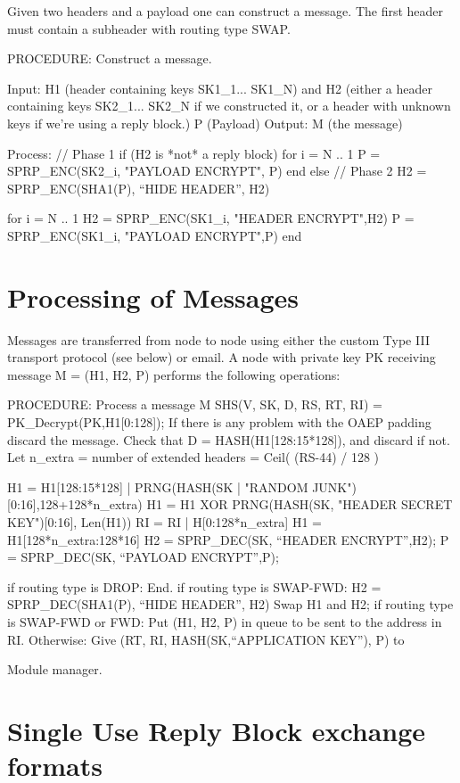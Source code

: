 Given two headers and a payload one can construct a
message. The first header must contain a subheader
with routing type SWAP.  

PROCEDURE: Construct a message.

Input: H1 (header containing keys SK1_1... SK1_N)
       and H2 (either a header containing keys SK2_1... SK2_N if
         we constructed it, or a header with unknown keys if we're
         using a reply block.)
       P (Payload)
Output: M (the message)

Process:
	// Phase 1
	if (H2 is *not* a reply block)
		for i = N .. 1
	            P = SPRP_ENC(SK2_i, "PAYLOAD ENCRYPT", P)
		end
        else
	// Phase 2
	H2 = SPRP_ENC(SHA1(P), ``HIDE HEADER'', H2)

	for i = N .. 1
		H2 = SPRP_ENC(SK1_i, "HEADER ENCRYPT",H2)
		P = SPRP_ENC(SK1_i, "PAYLOAD ENCRYPT",P)
	end

\section{Processing of Messages}

Messages are transferred from node to node using either the custom Type
III transport protocol (see below) or email.  A node with private key
PK receiving message M = (H1, H2, P) performs the following operations:

PROCEDURE: Process a message M
	SHS(V, SK, D, RS, RT, RI) = PK_Decrypt(PK,H1[0:128]);
        If there is any problem with the OAEP padding discard the message.
        Check that D = HASH(H1[128:15*128]), and discard if not.
        Let n_extra = number of extended headers = Ceil( (RS-44) / 128 )
                  
        H1 = H1[128:15*128] | PRNG(HASH(SK | "RANDOM 
                                               JUNK")[0:16],128+128*n_extra)
	H1 = H1 XOR PRNG(HASH(SK, "HEADER SECRET KEY")[0:16], Len(H1))
        RI = RI | H[0:128*n_extra]
        H1 = H1[128*n_extra:128*16]
	H2 = SPRP_DEC(SK, ``HEADER ENCRYPT'',H2);
	P = SPRP_DEC(SK, ``PAYLOAD ENCRYPT'',P);

	if routing type is DROP:
                End.
	if routing type is SWAP-FWD:
		H2 = SPRP_DEC(SHA1(P), ``HIDE HEADER'', H2)
		Swap H1 and H2;
        if routing type is SWAP-FWD or FWD:
	   	Put (H1, H2, P) in queue to be sent to the address in RI.
        Otherwise:
		Give (RT, RI, HASH(SK,``APPLICATION KEY''), P) to
		
Module manager. 

\section{Single Use Reply Block exchange formats}

